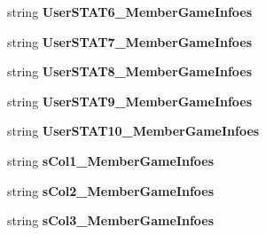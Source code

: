 \begin{DoxyCompactItemize}
\item 
string {\bfseries User\+S\+T\+A\+T6\+\_\+\+Member\+Game\+Infoes}\hypertarget{a00077_a57f9f0525c144668b6629860c1c36ec5}{}\label{a00077_a57f9f0525c144668b6629860c1c36ec5}

\item 
string {\bfseries User\+S\+T\+A\+T7\+\_\+\+Member\+Game\+Infoes}\hypertarget{a00077_a4c50c6c246f75269806bdba0a3c8da62}{}\label{a00077_a4c50c6c246f75269806bdba0a3c8da62}

\item 
string {\bfseries User\+S\+T\+A\+T8\+\_\+\+Member\+Game\+Infoes}\hypertarget{a00077_a2669edf6adacd00c429512c54017bc09}{}\label{a00077_a2669edf6adacd00c429512c54017bc09}

\item 
string {\bfseries User\+S\+T\+A\+T9\+\_\+\+Member\+Game\+Infoes}\hypertarget{a00077_a992623b4471195169b68ad2f309336a6}{}\label{a00077_a992623b4471195169b68ad2f309336a6}

\item 
string {\bfseries User\+S\+T\+A\+T10\+\_\+\+Member\+Game\+Infoes}\hypertarget{a00077_af3cb7bdf36b79eb7c5df324ff009dd2b}{}\label{a00077_af3cb7bdf36b79eb7c5df324ff009dd2b}

\item 
string {\bfseries s\+Col1\+\_\+\+Member\+Game\+Infoes}\hypertarget{a00077_aa057c776ffcc850cc4c57ee0f521eb49}{}\label{a00077_aa057c776ffcc850cc4c57ee0f521eb49}

\item 
string {\bfseries s\+Col2\+\_\+\+Member\+Game\+Infoes}\hypertarget{a00077_a58cf7376630bc409ba975e854f76fa44}{}\label{a00077_a58cf7376630bc409ba975e854f76fa44}

\item 
string {\bfseries s\+Col3\+\_\+\+Member\+Game\+Infoes}\hypertarget{a00077_a69fbe7b4ac78b5ea036719e33f709d26}{}\label{a00077_a69fbe7b4ac78b5ea036719e33f709d26}


\end{DoxyCompactItemize}
